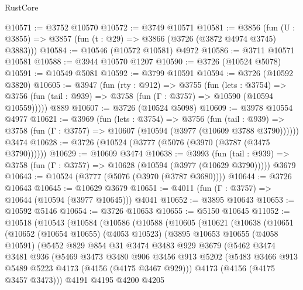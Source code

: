 \begin{lexlean}{RustCore}
\begin{coremodule}
@10571 := @3752 @10570
@10572 := @3749 @10571
@10581 := @3856
    (fun (U : @3855) => @3857 (fun (t : @29) => @3866 (@3726 (@3872 @4974 @3745) @3883)))
@10584 := @10546 (@10572 @10581) @4972
@10586 := @3711 @10571 @10581
@10588 := @3944 @10570 @1207
@10590 := @3726 (@10524 @5078)
@10591 := @10549 @5081
@10592 := @3799 @10591
@10594 := @3726 (@10592 @3820)
@10605 := @3947
    (fun (rty : @912) =>
    @3755
      (fun (lets : @3754) =>
      @3756 (fun (tail : @939) => @3758 (fun (Γ : @3757) => @10590 (@10594 @10559)))))
    @889
@10607 := @3726 (@10524 @5098)
@10609 := @3978 @10554 @4977
@10621 := @3969
    (fun (lets : @3754) =>
    @3756
      (fun (tail : @939) =>
      @3758 (fun (Γ : @3757) => @10607 (@10594 (@3977 (@10609 @3788 @3790))))))
    @3474
@10628 := @3726 (@10524 (@3777 (@5076 (@3970 (@3787 (@3475 @3790))))))
@10629 := @10609 @3474
@10638 := @3993
    (fun (tail : @939) => @3758 (fun (Γ : @3757) => @10628 (@10594 (@3977 (@10629 @3790)))))
    @3679
@10643 := @10524 (@3777 (@5076 (@3970 (@3787 @3680))))
@10644 := @3726 @10643
@10645 := @10629 @3679
@10651 := @4011 (fun (Γ : @3757) => @10644 (@10594 (@3977 @10645))) @4041
@10652 := @3895 @10643
@10653 := @10592 @5146
@10654 := @3726 @10653
@10655 := @5150 @10645
@11052 := @10518
    (@10543
      (@10584
        (@10586
          (@10588
            (@10605
              (@10621
                (@10638
                  (@10651
                    (@10652
                      (@10654 @10655)
                      (@4053 @10523)
                      (@3895
                        @10653
                        @10655
                        (@4058 @10591)
                        (@5452
                          @829
                          @854
                          @31
                          @3474
                          @3483
                          @929
                          @3679
                          (@5462
                            @3474
                            @3481
                            @936
                            (@5469
                              @3473
                              @3480
                              @906
                              @3456
                              @913
                              @5202
                              (@5483 @3466 @913 @5489 @5223 @4173 (@4156 (@4175 @3467 @929)))
                              @4173
                              (@4156 (@4175 @3457 @3473)))
                            @4191
                            @4195
                            @4200
                            @4205

\end{coremodule}
\end{lexlean}
